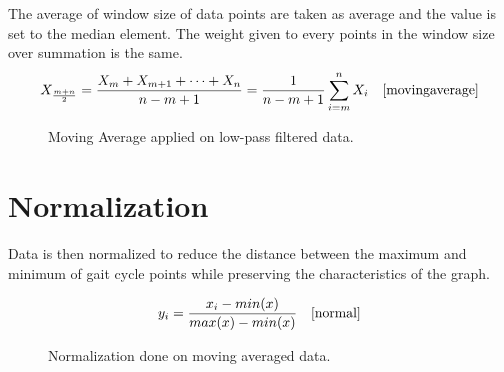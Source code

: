 The average of window size of data points are taken as average and the value is set to the median element. The weight given to every points in the window size over summation is the same.\newline
$$X_\frac{m+n}{2} = \frac{X_m + X_{m+1}+ \cdots + X_n}{n-m+1}
      = \frac{1}{n-m+1}\sum_{i=m}^{n} X_i \ \ \ \cite{movingaverage}$$

\begin{figure}
\caption{Moving Average applied on low-pass filtered data.}
\end{figure}

\section{Normalization}

Data is then normalized to reduce the distance between the maximum and minimum of 
gait cycle points while preserving the characteristics of the graph.\newline

$$ y_{i} = \frac{x_{i} - min(x)}{max(x) - min(x)} \ \ \ \cite{normal} $$
\begin{figure}
\caption{Normalization done on moving averaged data.}
\end{figure}

